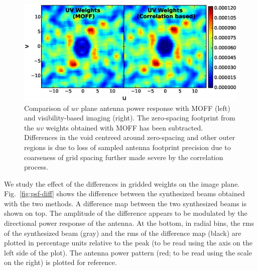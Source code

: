 \documentclass[a4paper,fleqn,usenatbib]{mnras}
\begin{document}
\begin{figure}
  \includegraphics[width=\columnwidth]{figure7}
  \caption{Comparison of $uv$ plane antenna power response with MOFF (left) and 
    visibility-based imaging (right). The zero-spacing footprint from the $uv$ 
    weights obtained with MOFF has been subtracted. Differences in the void 
    centreed around zero-spacing and other outer regions is due to loss of 
    sampled antenna footprint precision due to coarseness of grid spacing 
    further made severe by the correlation process.}
  \label{fig:MOFF-FX-uvwts}
\end{figure}

We study the effect of the differences in gridded weights on the image plane. 
Fig.~\ref{fig:psf-diff} shows the difference between the synthesized beams 
obtained with the two methods. A difference map between the two synthesized 
beams is shown on top. The amplitude of the difference appears to be 
modulated by the directional power response of the antenna. At the bottom, 
in radial bins, the rms of the synthesized beam (gray) and the rms of the 
difference map (black) are plotted in percentage units relative to the peak 
(to be read using the axis on the left side of the plot). The antenna power 
pattern (red; to be read using the scale on the right) is plotted for reference. 
\end{document}
